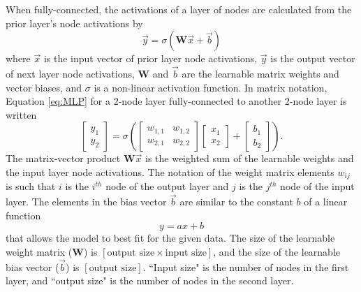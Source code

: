 When fully-connected, the activations of a layer of nodes are calculated from the prior layer's node activations by
\begin{equation} \label{eq:MLP}
	\vec{y} = \sigma \left(\textbf{W}\vec{x} + \vec{b}\right)
\end{equation}
where $\vec{x}$ is the input vector of prior layer node activations, $\vec{y}$ is the output vector of next layer node activations, $\textbf{W}$ and $\vec{b}$ are the learnable matrix weights and vector biases, and $\sigma$ is a non-linear activation function. In matrix notation, Equation \ref{eq:MLP} for a 2-node layer fully-connected to another 2-node layer is written
\begin{equation} \label{eq:MLP_matrix}
	\begin{bmatrix}
		y_{1} \\
		y_{2}
	\end{bmatrix}
	= \sigma \left(
	\begin{bmatrix}
		w_{1,1} & w_{1,2} \\
		w_{2,1} & w_{2,2}
	\end{bmatrix}
	\begin{bmatrix}
		x_{1} \\
		x_{2}
	\end{bmatrix}
	+
	\begin{bmatrix}
		b_{1} \\
		b_{2}
	\end{bmatrix}
	\right).
\end{equation}
The matrix-vector product $\textbf{W}\vec{x}$ is the weighted sum of the learnable weights and the input layer node activations. The notation of the weight matrix elements $w_{ij}$ is such that $i$ is the $i^{th}$ node of the output layer and $j$ is the $j^{th}$ node of the input layer. The elements in the bias vector $\vec{b}$ are similar to the constant $b$ of a linear function
\[
y = ax + b
\]
that allows the model to best fit for the given data. The size of the learnable weight matrix ($\textbf{W}$) is $\left[\text{output size} \times \text{input size}\right]$, and the size of the learnable bias vector ($\vec{b}$) is $\left[\text{output size}\right]$. ``Input size" is the number of nodes in the first layer, and ``output size" is the number of nodes in the second layer.

